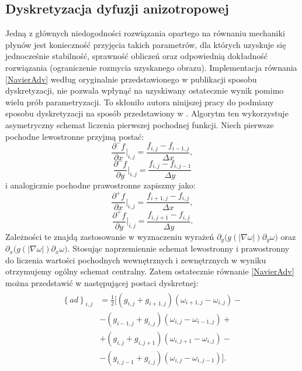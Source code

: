 \documentclass[12pt, twoside, openany]{report}
\theoremstyle{definition}
\begin{document}
\subsection{Dyskretyzacja dyfuzji anizotropowej}
\label{ssec:anisModNS}
Jedną z głównych niedogodności rozwiązania opartego na równaniu mechaniki płynów jest konieczność przyjęcia takich parametrów, dla których uzyskuje się jednocześnie stabilność, sprawność obliczeń oraz odpowiednią dokładność rozwiązania (ograniczenie rozmycia uzyskanego obrazu). Implementacja równania \eqref{NavierAdv} według oryginalnie przedstawionego w publikacji \cite{au2001image} sposobu dyskretyzacji, nie pozwala wpłynąć na uzyskiwany ostatecznie wynik pomimo wielu prób parametryzacji. To skłoniło autora ninijszej pracy do podmiany sposobu dyskretyzacji na sposób przedstawiony w \cite{van2005algorithms}. Algorytm ten wykorzystuje asymetryczny schemat liczenia pierwszej pochodnej funkcji. Niech pierwsze pochodne lewostronne przyjmą postać:
\begin{equation}
\frac{\partial^-f}{\partial x}\bigg|_{i,j}=\frac{f_{i,j}-f_{i-1,j}}{\Delta x}
\label{leftdfdx}
,
\end{equation}
\begin{equation}
{\frac{{\partial }^-f}{\partial y}}\bigg|_{i,j}=\frac{f_{i,j}-f_{i,j-1}}{\Delta y}
\label{leftdfdy}
\end{equation}
i analogicznie pochodne prawostronne zapiszmy jako:
\begin{equation}
{\frac{{\partial }^+f}{\partial x}}\bigg|_{i,j}=\frac{f_{i+1,j}-f_{i,j}}{\Delta x} 
\label{rightdfdx}
,
\end{equation}
\begin{equation}
{\frac{{\partial }^+f}{\partial y}}\bigg|_{i,j}=\frac{f_{i,j+1}-f_{i,j}}{\Delta y}
\label{rightdfdy}
.
\end{equation}
Zależności te znajdą zastosowanie w wyznaczeniu wyrażeń
${\partial }_y \Big(g\left(\left|\nabla \omega \right|\right){\partial }_y\omega \Big)$ oraz
${\partial }_x\Big(g\left(\left|\nabla \omega \right|\right){\partial }_x\omega \Big)$. Stosując naprzemiennie schemat lewostronny i prawostronny do liczenia wartości pochodnych wewnętrznych i zewnętrznych w wyniku otrzymujemy ogólny schemat centralny. Zatem ostatecznie równanie \eqref{NavierAdv} można przedstawić w następującej postaci dyskretnej:
\begin{align}
\begin{aligned}
{\left\{ad\right\}}_{i,j}
&= \frac{1}{2}\biggl[\left(g_{i,j}+g_{i+1,j}\right)\left({\omega }_{i+1,j}-{\omega }_{i,j}\right) -\\[1ex]
&- \left(g_{i-1,j}+g_{i,j}\right)\left({\omega }_{i,j}-{\omega }_{i-1,j}\right) +  \\[1ex]
&+ \left(g_{i,j}+g_{i,j+1}\right)\left({\omega }_{i,j+1}-{\omega }_{i,j}\right) -\\[1ex]
&- \left(g_{i,j-1}+g_{i,j}\right)\left({\omega }_{i,j}-{\omega }_{i,j-1}\right)\biggl].
\end{aligned}
\label{discreteAnisotropic2}
\end{align}
\end{document}
